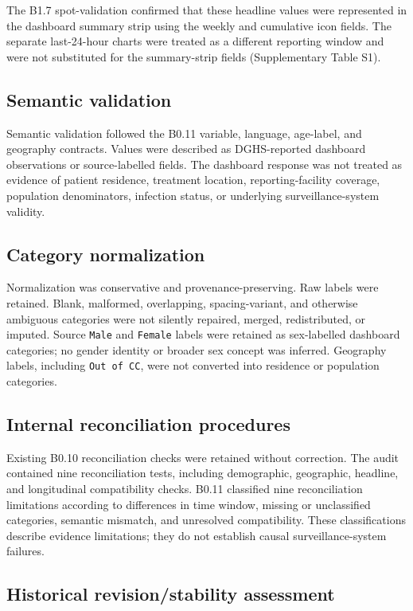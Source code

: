 The B1.7 spot-validation confirmed that these headline values were represented in the dashboard summary strip using the weekly and cumulative icon fields. The separate last-24-hour charts were treated as a different reporting window and were not substituted for the summary-strip fields (Supplementary Table S1).

\subsection{Semantic validation}

Semantic validation followed the B0.11 variable, language, age-label, and geography contracts. Values were described as DGHS-reported dashboard observations or source-labelled fields. The dashboard response was not treated as evidence of patient residence, treatment location, reporting-facility coverage, population denominators, infection status, or underlying surveillance-system validity.

\subsection{Category normalization}

Normalization was conservative and provenance-preserving. Raw labels were retained. Blank, malformed, overlapping, spacing-variant, and otherwise ambiguous categories were not silently repaired, merged, redistributed, or imputed. Source \texttt{Male} and \texttt{Female} labels were retained as sex-labelled dashboard categories; no gender identity or broader sex concept was inferred. Geography labels, including \texttt{Out of CC}, were not converted into residence or population categories.

\subsection{Internal reconciliation procedures}

Existing B0.10 reconciliation checks were retained without correction. The audit contained nine reconciliation tests, including demographic, geographic, headline, and longitudinal compatibility checks. B0.11 classified nine reconciliation limitations according to differences in time window, missing or unclassified categories, semantic mismatch, and unresolved compatibility. These classifications describe evidence limitations; they do not establish causal surveillance-system failures.

\subsection{Historical revision/stability assessment}

